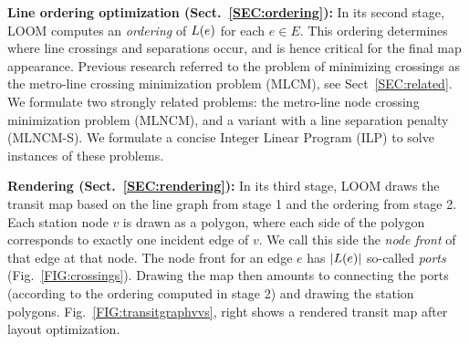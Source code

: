 \documentclass[sigconf]{acmart}
\begin{document}
\smallskip\noindent
{\bf Line ordering optimization (Sect.~\ref{SEC:ordering}):}
In its second stage, LOOM computes an \emph{ordering} of $L(e)$ for each $e \in E$.
This ordering determines where line crossings and separations occur, and is hence critical for the final map appearance.
Previous research referred to the problem of minimizing crossings as the metro-line crossing minimization problem (MLCM), see Sect~\ref{SEC:related}. We formulate two strongly related problems: the metro-line node crossing minimization problem (MLNCM), and a variant with a line separation penalty (MLNCM-S). We formulate a concise Integer Linear Program (ILP) to solve instances of these problems.

\smallskip\noindent
{\bf Rendering (Sect.~\ref{SEC:rendering}):}
In its third stage, LOOM draws the transit map based on the line graph from stage 1 and the ordering from stage 2.
Each station node $v$ is drawn as a polygon, where each side of the polygon corresponds to exactly one incident edge of $v$.
We call this side the \emph{node front} of that edge at that node.
The node front for an edge $e$ has $|L(e)|$ so-called \emph{ports} (Fig.~\ref{FIG:crossings}).
Drawing the map then amounts to connecting the ports (according to the ordering computed in stage 2) and drawing the station polygons.
Fig.~\ref{FIG:transitgraphvvs}, right shows a rendered transit map after layout optimization.
\end{document}
